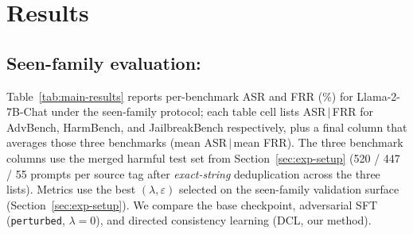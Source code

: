 \documentclass{article}
\begin{document}
\section{Results}
\label{sec:results}


\subsection{Seen-family evaluation: }
\label{sec:results-seen}

Table~\ref{tab:main-results} reports per-benchmark ASR and FRR (\%) for Llama-2-7B-Chat under the seen-family protocol; each table cell lists ASR$\,|\,$FRR for AdvBench, HarmBench, and JailbreakBench respectively, plus a final column that averages those three benchmarks (mean ASR$\,|\,$mean FRR). The three benchmark columns use the merged harmful test set from Section~\ref{sec:exp-setup} (520 / 447 / 55 prompts per source tag after \emph{exact-string} deduplication across the three lists). Metrics use the best $(\lambda,\varepsilon)$ selected on the seen-family validation surface (Section~\ref{sec:exp-setup}). We compare the base checkpoint, adversarial SFT (\texttt{perturbed}, $\lambda{=}0$), and directed consistency learning (DCL, our method).
\end{document}
